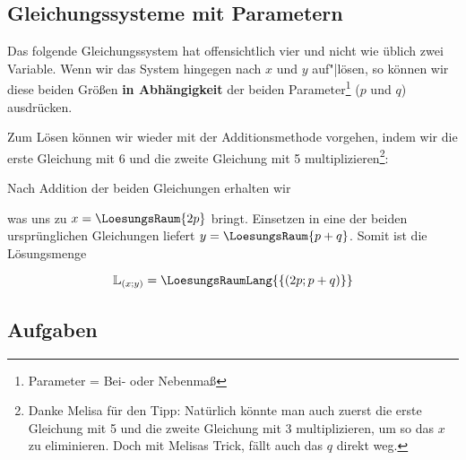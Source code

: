 \subsection{Gleichungssysteme mit Parametern}
Das folgende Gleichungssystem hat offensichtlich vier und nicht wie
üblich zwei Variable. Wenn wir das System hingegen nach $x$ und $y$
auf"|lösen, so können wir diese beiden Größen
\textbf{in Abhängigkeit} der beiden Parameter\footnote{Parameter =
  Bei- oder Nebenmaß} ($p$ und $q$) ausdrücken.


Zum Lösen können wir wieder mit der Additionsmethode vorgehen, indem
wir die erste Gleichung mit 6 und die zweite Gleichung mit 5 multiplizieren\footnote{Danke Melisa für den Tipp: Natürlich könnte man auch zuerst die erste Gleichung mit 5 und die zweite Gleichung mit 3 multiplizieren, um so das $x$ zu eliminieren. Doch mit Melisas Trick, fällt auch das $q$ direkt weg.
}:


Nach Addition der beiden Gleichungen erhalten wir


was uns zu $x=\LoesungsRaum{2p}$ bringt.
Einsetzen in eine der beiden ursprünglichen Gleichungen liefert $y=\LoesungsRaum{p+q}$.
Somit ist die Lösungsmenge


$$\mathbb{L}_{(x;y)} = \LoesungsRaumLang{\left\{(2p; p+q)\right\}}$$


\subsection*{Aufgaben}
